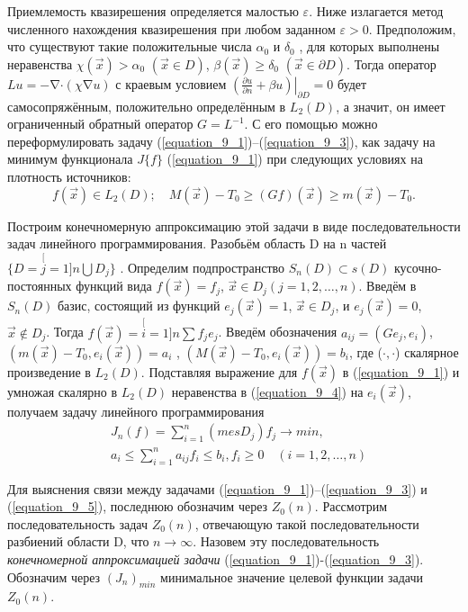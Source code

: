 Приемлемость квазирешения определяется малостью $\varepsilon$. Ниже излагается метод численного нахождения квазирешения при любом заданном $\varepsilon {>}0$. Предположим, что существуют такие положительные числа $\alpha_0$ и $\delta_0 $ , для которых выполнены неравенства $\chi(\vec x){>}\alpha_0$ $(\vec x {\in} D)$, $\beta(\vec x){\ge} \delta_0$ $(\vec x {\in} \partial D)$. Тогда оператор $Lu{=}{-}\mathop{\nabla}\cdot(\chi\mathop{\nabla}u)$ с краевым условием $\left.\left(\frac{\partial u}{\partial n}+ \beta u\right)\right|_{\partial D}{=}0$ будет самосопряжённым, положительно определённым в $L_2(D)$, а значит, он имеет ограниченный обратный оператор $G{=}L^{-1}$. С его помощью можно переформулировать задачу (\ref{equation_9_1})--(\ref{equation_9_3}),  как задачу на минимум функционала $J\{f\}$ (\ref{equation_9_1}) при следующих условиях на плотность источников:
              \begin{equation} \label{equation_9_4}
              f(\vec x)\in L_2(D);\quad M(\vec x)-T_0\ge (Gf)(\vec x)\ge m(\vec x)-T_0.
              \end{equation}

Построим конечномерную аппроксимацию этой задачи в виде последовательности задач линейного программирования. Разобьём область D на n частей $\{D{=}{\stackrel[j=1]{n}{\bigcup}}D_j\}$ . Определим подпространство $S_n(D){\subset} s(D)$ кусочно-постоянных функций вида $f(\vec x){=}f_j$, $\vec x{\in} D_j (j{=}1,2,\ldots,n)$. Введём в $S_n(D)$ базис, состоящий из функций $e_j(\vec x){=}1$, $\vec x{\in} D_j$, и $e_j(\vec x){=}0$, $\vec x{\notin} D_j$. Тогда $f(\vec x){=}{\stackrel[i=1]{n}{\sum}}f_je_j$. Введём обозначения $a_{ij}{=}(Ge_j,e_i)$, $(m(\vec x){-}T_0,e_i(\vec x)){=}a_i$ , $(M(\vec x)-T_0,e_i(\vec x)){=}b_i$, где ($\cdot {,}\cdot$) скалярное произведение в $L_2(D)$. Подставляя выражение для $f(\vec x)$ в (\ref{equation_9_1}) и умножая скалярно в $L_2(D)$ неравенства в (\ref{equation_9_4}) на $e_i(\vec x)$, получаем задачу линейного программирования
 		\begin{equation}\label{equation_9_5}\begin{split}
        &J_n(f)=\sum_{i=1}^n(mesD_j)f_j\to min,\\
        &a_i\le \sum_{i=1}^na_{ij}f_i\le b_i,f_i\ge 0\quad (i=1,2,\ldots,n)
         \end{split}\end{equation}

Для выяснения связи между задачами (\ref{equation_9_1})--(\ref{equation_9_3}) и (\ref{equation_9_5}), последнюю обозначим через $Z_0(n)$. Рассмотрим последовательность задач $Z_0(n)$, отвечающую такой последовательности разбиений области D, что $n{\to}\infty$. Назовем эту последовательность \textit{конечномерной аппроксимацией задачи} (\ref{equation_9_1})-(\ref{equation_9_3}). Обозначим через $(J_n)_{min}$ минимальное значение целевой функции задачи $Z_0(n)$.

